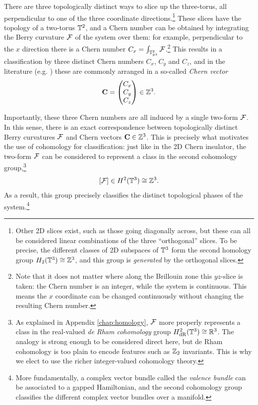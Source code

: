 There are three topologically distinct ways to slice up the three-torus, all perpendicular to one of the three coordinate directions.\footnote{
	Other 2D slices exist, such as those going diagonally across, but these can all be considered linear combinations of the three ``orthogonal'' slices. To be precise, the different classes of 2D subspaces of $\mathbb{T}^3$ form the second homology group $H_2(\mathbb{T}^3)\cong\mathbb{Z}^3$, and this group is \emph{generated} by the orthogonal slices.}
These slices have the topology of a two-torus $\mathbb{T}^2$, and a Chern number can be obtained by integrating the Berry curvature $\mathcal{F}$ of the system over them: for example, perpendicular to the $x$ direction there is a Chern number $C_{x} = \int_{\mathbb{T}_{yz}^2}\mathcal{F}$.\footnote{
	Note that it does not matter where along the Brillouin zone this $yz$-slice is taken: the Chern number is an integer, while the system is continuous. This means the $x$ coordinate can be changed continuously without changing the resulting Chern number.}
This results in a classification by three distinct Chern numbers $C_x$, $C_y$ and $C_z$, and in the literature (e.g. \cites{Vanderbilt_2018}{Liu_photonic-Chern-vector}) these are commonly arranged in a so-called \emph{Chern vector}
\[
	\vb{C} = \begin{pmatrix}
		C_x \\ C_y \\ C_z
	\end{pmatrix} \in \mathbb{Z}^3.
\]

Importantly, these three Chern numbers are all induced by a single two-form $\mathcal{F}$. In this sense, there is an exact correspondence between topologically distinct Berry curvatures $\mathcal{F}$ and Chern vectors $\vb{C}\in\mathbb{Z}^3$. This is precisely what motivates the use of cohomology for classification: just like in the 2D Chern insulator, the two-form $\mathcal{F}$ can be considered to represent a class in the second cohomology group,\footnote{
	As explained in Appendix \ref{chap:homology}, $\mathcal{F}$ more properly represents a class in the real-valued \emph{de Rham cohomology} group $H_{\rm dR}^2(\mathbb{T}^3)\cong\mathbb{R}^3$. The analogy is strong enough to be considered direct here, but de Rham cohomology is too plain to encode features such as $\mathbb{Z}_2$ invariants. This is why we elect to use the richer integer-valued cohomology theory.} %
\begin{equation}\label{eq:2nd-cohom-t3}
	[\mathcal{F}]\in H^2(\mathbb{T}^3)\cong\mathbb{Z}^3. 
\end{equation}
As a result, this group precisely classifies the distinct topological phases of the system.\footnote{
	More fundamentally, a complex vector bundle called the \emph{valence bundle} can be associated to a gapped Hamiltonian, and the second cohomology group classifies the different complex vector bundles over a manifold.} %

